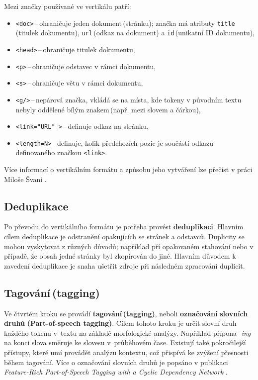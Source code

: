 Mezi značky používané ve vertikálu patří:

\begin{itemize}
\item \texttt{<doc>}\,--\,ohraničuje jeden dokument\,(stránku); značka má atributy \texttt{title}\,(titulek dokumentu), \texttt{url}\,(odkaz na dokument) a \texttt{id}\,(unikatní ID dokumentu),

\item \texttt{<head>}\,--\,ohraničuje titulek dokumentu,

\item \texttt{<p>}\,--\,ohraničuje odstavec v rámci dokumentu,

\item \texttt{<s>}\,--\,ohraničuje větu v rámci dokumentu,

\item \texttt{<g/>}\,--\,nepárová značka, vkládá se na místa, kde tokeny v původním textu nebyly oddělené bílým znakem\,(např. mezi slovem a čárkou),

\item \texttt{<link="URL"\,>}\,--\,definuje odkaz na stránku,

\item \texttt{<length=N>}\,--\,definuje, kolik předchozích pozic je součástí odkazu definovaného značkou \texttt{<link>}.
\end{itemize}

Více informací o vertikálním formátu a způsobu jeho vytváření lze přečíst v práci Miloše Švani \cite{Vertical}.

\subsection*{Deduplikace}
Po převodu do vertikálního formátu je potřeba provést \textbf{deduplikaci}. Hlavním cílem deduplikace je odstranění opakujících se stránek a odstavců. Duplicity se mohou vyskytovat z různých důvodů; například pří opakovaném stahování nebo v případě, že obsah jedné stránky byl zkopírován do jiné. Hlavním důvodem k zavedení deduplikace je snaha ušetřit zdroje při následném zpracování duplicit.



\subsection*{Tagování\,(tagging)}
Ve čtvrtém kroku se provádí  \textbf{tagování\,(tagging)}, neboli \textbf{označování} \textbf{slovních} \textbf{druhů} \textbf{(Part-of-speech tagging)}. Cílem tohoto kroku je určit slovní druh každého tokenu v~textu na základě morfologické analýzy. Například přípona \emph{-ing} na konci slova směruje ke slovesu v~průběhovém čase. Existují také pokročilejší přístupy, které umí provádět analýzu kontextu, což přispívá ke zvýšení přesnosti během tagování. Více o označování slovních druhů je popsáno v publikaci \emph{Feature-Rich Part-of-Speech Tagging with a Cyclic Dependency Network} \cite{Toutanova03feature-richpart-of-speech}. 

